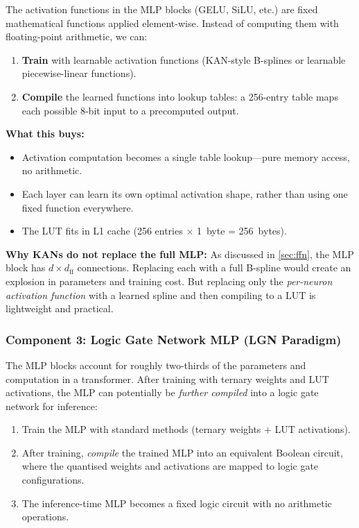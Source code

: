 The activation functions in the MLP blocks (GELU, SiLU, etc.)
are fixed mathematical functions applied element-wise. Instead of
computing them with floating-point arithmetic, we can:

\begin{enumerate}[leftmargin=2em]
  \item \textbf{Train} with learnable activation functions
    (KAN-style B-splines or learnable piecewise-linear functions).
  \item \textbf{Compile} the learned functions into lookup tables:
    a 256-entry table maps each possible 8-bit input to a
    precomputed output.
\end{enumerate}

\textbf{What this buys:}
\begin{itemize}[leftmargin=2em]
  \item Activation computation becomes a single table lookup---pure
    memory access, no arithmetic.
  \item Each layer can learn its own optimal activation shape, rather
    than using one fixed function everywhere.
  \item The LUT fits in L1 cache (256 entries $\times$ 1~byte = 256~bytes).
\end{itemize}

\textbf{Why KANs do not replace the full MLP:} As discussed in
\cref{sec:ffn}, the MLP block has $d \times d_\text{ff}$ connections.
Replacing each with a full B-spline would create an explosion in
parameters and training cost. But replacing only the
\emph{per-neuron activation function} with a learned spline and then
compiling to a LUT is lightweight and practical.

\subsubsection{Component 3: Logic Gate Network MLP (LGN Paradigm)}

The MLP blocks account for roughly two-thirds of the parameters and
computation in a transformer. After training with ternary weights and
LUT activations, the MLP can potentially be \emph{further compiled}
into a logic gate network for inference:

\begin{enumerate}[leftmargin=2em]
  \item Train the MLP with standard methods (ternary weights + LUT
    activations).
  \item After training, \emph{compile} the trained MLP into an
    equivalent Boolean circuit, where the quantised weights and
    activations are mapped to logic gate configurations.
  \item The inference-time MLP becomes a fixed logic circuit with no
    arithmetic operations.
\end{enumerate}

